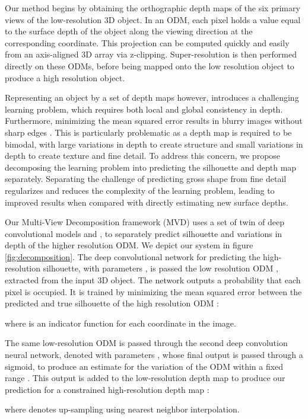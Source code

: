 \documentclass{article}
\begin{document}
Our method begins by obtaining the orthographic depth maps of the six primary views of the low-resolution 3D object. In an ODM, each pixel holds a value equal to the surface depth of the object along the viewing direction at the corresponding coordinate. This projection can be computed quickly and easily from an axis-aligned 3D array via z-clipping. Super-resolution is then performed directly on these ODMs, before being mapped onto the low resolution object to produce a high resolution object. 

Representing an object by a set of depth maps however, introduces a challenging learning problem, which requires both local and global consistency in depth. Furthermore, minimizing the mean squared error results in blurry images without sharp edges \cite{mathieu2015deep,pathak2016context}. This is particularly problematic as a depth map is required to be bimodal, with large variations in depth to create structure and small variations in depth to create texture and fine detail. To address this concern, we propose decomposing the learning problem into predicting the silhouette and depth map separately. Separating the challenge of predicting gross shape from fine detail regularizes and reduces the complexity of the learning problem, leading to improved results when compared with directly estimating new surface depths. 

Our Multi-View Decomposition framework (MVD) uses a set of twin of deep convolutional models  and , to separately predict silhouette and variations in depth of the higher resolution ODM. We depict our system in figure \ref{fig:decomposition}. The deep convolutional network for predicting the high-resolution silhouette,  with parameters , is passed the low resolution ODM , extracted from the input 3D object. The network outputs a probability that each pixel is occupied. It is trained by minimizing the mean squared error between the predicted and true silhouette of the high resolution ODM :

where  is an indicator function for each coordinate in the image.

The same low-resolution ODM  is passed through the second deep convolution neural network, denoted  with parameters , whose final output is passed through a sigmoid, to produce an estimate for the variation of the ODM within a fixed range . This output is added to the low-resolution depth map to produce our prediction for a constrained high-resolution depth map : 

where  denotes up-sampling using nearest neighbor interpolation.
 
\end{document}
